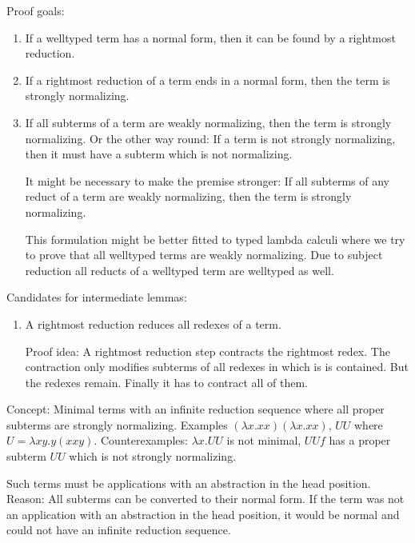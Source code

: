 Proof goals:
\begin{enumerate}
    \item If a welltyped term has a normal form, then it can be found
        by a rightmost reduction.

    \item If a rightmost reduction of a term ends in a normal form, then
        the term is strongly normalizing.

    \item  If all subterms of a term are weakly normalizing, then the term
        is strongly normalizing. Or the other way round: If a term is not
        strongly normalizing, then it must have a subterm which is not
        normalizing.

        It might be necessary to make the premise stronger: If all subterms of
        any reduct of a term are weakly normalizing, then the term is strongly
        normalizing.

        This formulation might be better fitted to typed lambda calculi
        where we try to prove that all welltyped terms are weakly normalizing.
        Due to subject reduction all reducts of a welltyped term are welltyped
        as well.
\end{enumerate}

Candidates for intermediate lemmas:
\begin{enumerate}
    \item A rightmost reduction reduces all redexes of a term.

        Proof idea: A rightmost reduction step contracts the rightmost redex.
        The contraction only modifies subterms of all redexes
        in which is is contained. But the redexes remain. Finally it has to
        contract all of them.
\end{enumerate}


Concept: Minimal terms with an infinite reduction sequence where all proper
subterms are strongly normalizing. Examples $(\lambda x. x x)(\lambda x. x x)$,
$U U$ where $U = \lambda x y. y (x x y)$. Counterexamples: $\lambda x. UU$ is
not minimal, $UU f$ has a proper subterm $UU$ which is not strongly normalizing.

Such terms must be applications with an abstraction in the head position.
Reason: All subterms can be converted to their normal form.  If the term was not
an application with  an abstraction in the head position, it would be normal and
could not have an infinite reduction sequence.

